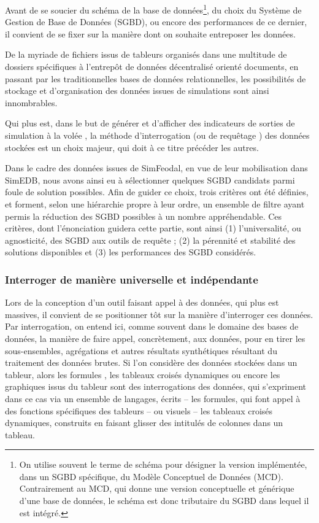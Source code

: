 	Avant de se soucier du \og schéma\fg{} de la base de données\footnote{
		On utilise souvent le terme de \og schéma\fg{} pour désigner la version implémentée, dans un SGBD spécifique, du Modèle Conceptuel de Données (MCD). Contrairement au MCD, qui donne une version conceptuelle et générique d'une base de données, le schéma est donc tributaire du SGBD dans lequel il est intégré.
	}, du choix du Système de Gestion de Base de Données (SGBD), ou encore des performances de ce dernier, il convient de se fixer sur la manière dont on souhaite entreposer les données.

	De la myriade de fichiers issus de tableurs organisés dans une multitude de dossiers spécifiques à l'entrepôt de données décentralisé orienté documents, en passant par les traditionnelles bases de données relationnelles, les possibilités de stockage et d'organisation des données issues de simulations sont ainsi innombrables.

	Qui plus est, dans le but de générer et d'afficher des indicateurs de sorties de simulation \og à la volée \fg{}, la méthode d'interrogation (ou de \og requêtage \fg{}) des données stockées est un choix majeur, qui doit à ce titre précéder les autres.

	Dans le cadre des données issues de SimFeodal, en vue de leur mobilisation dans SimEDB, nous avons ainsi eu à sélectionner quelques SGBD candidats parmi foule de solution possibles.
	Afin de guider ce choix, trois critères ont été définies, et forment, selon une hiérarchie propre à leur ordre, un ensemble de filtre ayant permis la réduction des SGBD possibles à un nombre appréhendable.
	Ces critères, dont l'énonciation guidera cette partie, sont ainsi (1) l'universalité, ou \og agnosticité\fg{}, des SGBD aux outils de requête ; (2) la pérennité et stabilité des solutions disponibles et (3) les performances des SGBD considérés.

		\subsubsection{Interroger de manière universelle et indépendante}

		Lors de la conception d'un outil faisant appel à des données, qui plus est massives, il convient de se positionner tôt sur la manière d'interroger ces données.
		Par interrogation, on entend ici, comme souvent dans le domaine des bases de données, la manière de faire appel, concrètement, aux données, pour en tirer les sous-ensembles, agrégations et autres résultats synthétiques résultant du traitement des données brutes.
		Si l'on considère des données stockées dans un tableur, alors les \og formules \fg{}, les tableaux croisés dynamiques ou encore les graphiques issus du tableur sont des interrogations des données, qui s'expriment dans ce cas via un ensemble de langages, écrits -- les formules, qui font appel à des fonctions spécifiques des tableurs -- ou visuels -- les tableaux croisés dynamiques, construits en faisant glisser des intitulés de colonnes dans un tableau.

